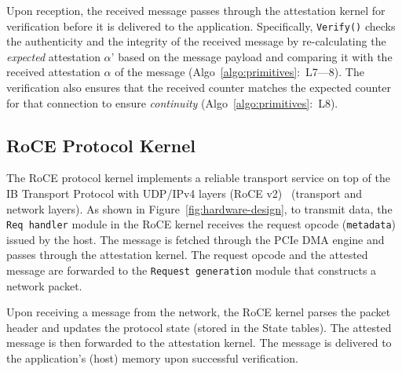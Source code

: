 Upon reception, the received message passes through the attestation kernel for verification before it is delivered to the application. Specifically, \texttt{Verify()} checks the authenticity and the integrity of the received message by re-calculating the {\em expected} attestation $\alpha$' based on the message payload and comparing it with the received attestation $\alpha$ of the message (Algo~\ref{algo:primitives}:~L7---8). The verification also ensures that the received counter matches the expected counter for that connection to ensure \emph{continuity} (Algo~\ref{algo:primitives}:~L8). 





\subsection{RoCE Protocol Kernel}
\label{subsec:roce_protocol_kernel}

The RoCE protocol kernel implements a reliable transport service on top of the IB Transport Protocol with UDP/IPv4 layers (RoCE v2)~\cite{infiniband} (transport and network layers). As shown in Figure~\ref{fig:hardware-design}, to transmit data, the {\tt Req handler} module in the RoCE kernel receives the request opcode ({\tt metadata}) issued by the host. The message is fetched through the PCIe DMA engine and passes through the attestation kernel. The request opcode and the attested message are forwarded to the {\tt Request generation} module that constructs a network packet. 

Upon receiving a message from the network, the RoCE kernel parses the packet header and updates the protocol state (stored in the State tables). The attested message is then forwarded to the attestation kernel. The message is delivered to the application’s (host) memory upon successful verification.

